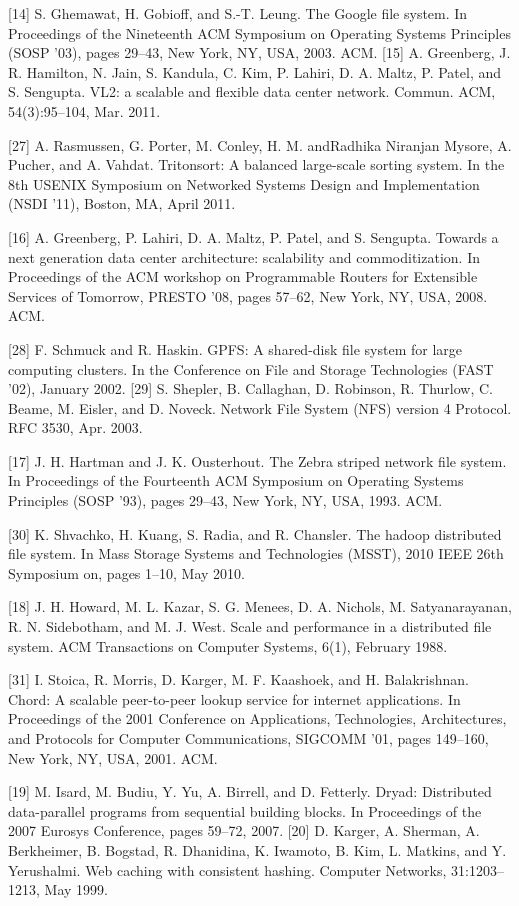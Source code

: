 [14] S. Ghemawat, H. Gobioff, and S.-T. Leung. The Google file system. In Proceedings of the Nineteenth ACM Symposium on Operating Systems Principles (SOSP ’03), pages 29–43, New York,
NY, USA, 2003. ACM.
[15] A. Greenberg, J. R. Hamilton, N. Jain, S. Kandula, C. Kim,
P. Lahiri, D. A. Maltz, P. Patel, and S. Sengupta. VL2: a scalable
and flexible data center network. Commun. ACM, 54(3):95–104,
Mar. 2011.

[27] A. Rasmussen, G. Porter, M. Conley, H. M. andRadhika Niranjan Mysore, A. Pucher, and A. Vahdat. Tritonsort: A balanced
large-scale sorting system. In the 8th USENIX Symposium on Networked Systems Design and Implementation (NSDI ’11), Boston,
MA, April 2011.

[16] A. Greenberg, P. Lahiri, D. A. Maltz, P. Patel, and S. Sengupta.
Towards a next generation data center architecture: scalability
and commoditization. In Proceedings of the ACM workshop
on Programmable Routers for Extensible Services of Tomorrow,
PRESTO ’08, pages 57–62, New York, NY, USA, 2008. ACM.

[28] F. Schmuck and R. Haskin. GPFS: A shared-disk file system for
large computing clusters. In the Conference on File and Storage
Technologies (FAST ’02), January 2002.
[29] S. Shepler, B. Callaghan, D. Robinson, R. Thurlow, C. Beame,
M. Eisler, and D. Noveck. Network File System (NFS) version 4
Protocol. RFC 3530, Apr. 2003.

[17] J. H. Hartman and J. K. Ousterhout. The Zebra striped network
file system. In Proceedings of the Fourteenth ACM Symposium
on Operating Systems Principles (SOSP ’93), pages 29–43, New
York, NY, USA, 1993. ACM.

[30] K. Shvachko, H. Kuang, S. Radia, and R. Chansler. The hadoop
distributed file system. In Mass Storage Systems and Technologies (MSST), 2010 IEEE 26th Symposium on, pages 1–10, May
2010.

[18] J. H. Howard, M. L. Kazar, S. G. Menees, D. A. Nichols,
M. Satyanarayanan, R. N. Sidebotham, and M. J. West. Scale
and performance in a distributed file system. ACM Transactions
on Computer Systems, 6(1), February 1988.

[31] I. Stoica, R. Morris, D. Karger, M. F. Kaashoek, and H. Balakrishnan. Chord: A scalable peer-to-peer lookup service for internet
applications. In Proceedings of the 2001 Conference on Applications, Technologies, Architectures, and Protocols for Computer
Communications, SIGCOMM ’01, pages 149–160, New York,
NY, USA, 2001. ACM.

[19] M. Isard, M. Budiu, Y. Yu, A. Birrell, and D. Fetterly. Dryad: Distributed data-parallel programs from sequential building blocks.
In Proceedings of the 2007 Eurosys Conference, pages 59–72,
2007.
[20] D. Karger, A. Sherman, A. Berkheimer, B. Bogstad, R. Dhanidina, K. Iwamoto, B. Kim, L. Matkins, and Y. Yerushalmi. Web
caching with consistent hashing. Computer Networks, 31:1203–
1213, May 1999.

